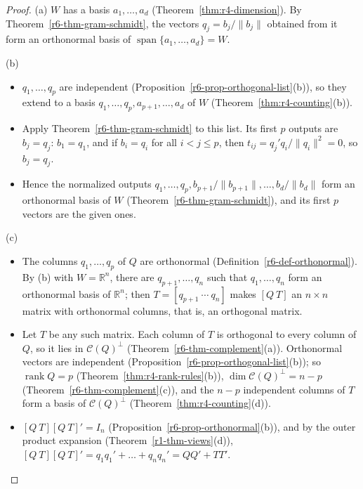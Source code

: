 \documentclass[12pt]{article}
\newcommand{\R}{\mathbb R}
\DeclareMathOperator{\rank}{rank}
\DeclareMathOperator{\Span}{span}
\theoremstyle{definition}
\begin{document}
\begin{proof}
(a) \(W\) has a basis \(a_1,\dots,a_d\) (Theorem~\ref{thm:r4-dimension}). By
Theorem~\ref{r6-thm-gram-schmidt}, the vectors \(q_j=b_j/\lVert b_j\rVert\) obtained from it form an orthonormal
basis of \(\Span\{a_1,\dots,a_d\}=W\).

(b)
\begin{itemize}
\item \(q_1,\dots,q_p\) are independent (Proposition~\ref{r6-prop-orthogonal-list}(b)), so they extend to a
basis \(q_1,\dots,q_p,a_{p+1},\dots,a_d\) of \(W\) (Theorem~\ref{thm:r4-counting}(b)).
\item Apply Theorem~\ref{r6-thm-gram-schmidt} to this list. Its first \(p\) outputs are \(b_j=q_j\): \(b_1=q_1\),
and if \(b_i=q_i\) for all \(i<j\leqslant p\), then \(t_{ij}=q_j'q_i/\lVert q_i\rVert^2=0\), so \(b_j=q_j\).
\item Hence the normalized outputs \(q_1,\dots,q_p,b_{p+1}/\lVert b_{p+1}\rVert,\dots,b_d/\lVert b_d\rVert\) form an
orthonormal basis of \(W\) (Theorem~\ref{r6-thm-gram-schmidt}), and its first \(p\) vectors are the given
ones.
\end{itemize}
(c)
\begin{itemize}
\item The columns \(q_1,\dots,q_p\) of \(Q\) are orthonormal (Definition~\ref{r6-def-orthonormal}). By (b) with
\(W=\R^n\), there are \(q_{p+1},\dots,q_n\) such that \(q_1,\dots,q_n\) form an orthonormal basis of \(\R^n\);
then \(T=[q_{p+1}\ \cdots\ q_n]\) makes \([Q\ T]\) an \(n\times n\) matrix with orthonormal columns, that is,
an orthogonal matrix.
\item Let \(T\) be any such matrix. Each column of \(T\) is orthogonal to every column of \(Q\), so it lies in
\(\mathcal C(Q)^\perp\) (Theorem~\ref{r6-thm-complement}(a)). Orthonormal vectors are independent
(Proposition~\ref{r6-prop-orthogonal-list}(b)); so \(\rank Q=p\) (Theorem~\ref{thm:r4-rank-rules}(b)),
\(\dim\mathcal C(Q)^\perp=n-p\) (Theorem~\ref{r6-thm-complement}(c)), and the \(n-p\) independent columns of
\(T\) form a basis of \(\mathcal C(Q)^\perp\) (Theorem~\ref{thm:r4-counting}(d)).
\item \([Q\ T][Q\ T]'=I_n\) (Proposition~\ref{r6-prop-orthonormal}(b)), and by the outer product expansion
(Theorem~\ref{r1-thm-views}(d)), \([Q\ T][Q\ T]'=q_1q_1'+\dots+q_nq_n'=QQ'+TT'\).\qedhere
\end{itemize}
\end{proof}
\end{document}
